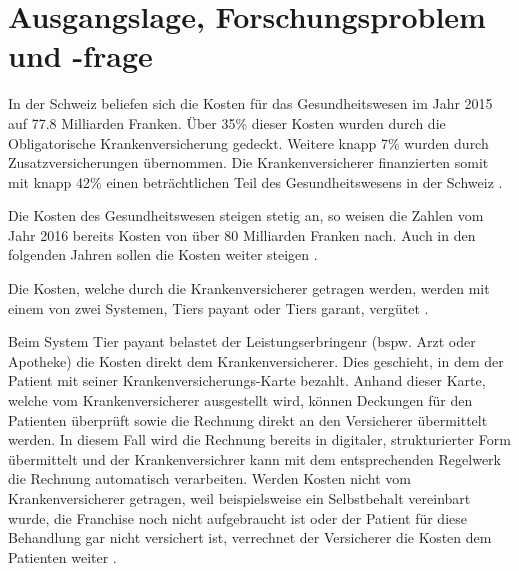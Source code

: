 \documentclass[12pt, twoside]{extarticle}
\begin{document}
\section{Ausgangslage, Forschungsproblem und -frage}


In der Schweiz beliefen sich die Kosten für das Gesundheitswesen im Jahr 2015 auf 77.8 Milliarden Franken. Über 35\% dieser Kosten wurden durch die Obligatorische Krankenversicherung gedeckt. Weitere knapp 7\% wurden durch Zusatzversicherungen übernommen. Die Krankenversicherer finanzierten somit mit knapp 42\% einen beträchtlichen Teil des Gesundheitswesens in der Schweiz \cite{BundesamtfurStatistik2018Finanzierung, BundesamtfurStatistik2017KostenDaten}.

Die Kosten des Gesundheitswesen steigen stetig an, so weisen die Zahlen vom Jahr 2016 bereits Kosten von über 80 Milliarden Franken nach. Auch in den folgenden Jahren sollen die Kosten weiter steigen \cite{BundesamtfurStatistik2018Finanzierung}.

Die Kosten, welche durch die Krankenversicherer getragen werden, werden mit einem von zwei Systemen, Tiers payant oder Tiers garant, vergütet \cite{EidgenossischesDepartementdesInnern2017FaktenblattVergutungssysteme}. 

Beim System Tier payant belastet der Leistungserbringenr (bspw. Arzt oder Apotheke) die Kosten direkt dem Krankenversicherer. Dies geschieht, in dem der Patient mit seiner Kranken\-versicherungs-Karte bezahlt. Anhand dieser Karte, welche vom Krankenversicherer ausgestellt wird, können Deckungen für den Patienten überprüft sowie die Rechnung direkt an den Versicherer übermittelt werden. In diesem Fall wird die Rechnung bereits in digitaler, strukturierter Form übermittelt und der Krankenversichrer kann mit dem entsprechenden Regelwerk die Rechnung automatisch verarbeiten. Werden Kosten nicht vom Krankenversicherer getragen, weil beispielsweise ein Selbstbehalt vereinbart wurde, die Franchise noch nicht aufgebraucht ist oder der Patient für diese Behandlung gar nicht versichert ist, verrechnet der Versicherer die Kosten dem Patienten weiter \cite{EidgenossischesDepartementdesInnern2017FaktenblattVergutungssysteme}.
\end{document}
